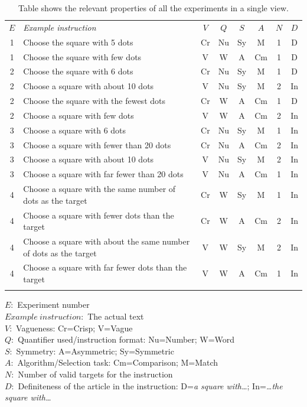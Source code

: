 \documentclass[graybox,envcountchap,sectrefs%
,footinfo
]{svmono}
\begin{document}
\begin{table}
\caption{Table shows the relevant properties of all the experiments in a single view.}
\label{AllInstructions} 
\begin{tabular}{clcccccc}
\hline\noalign{\smallskip}
$E$&\emph{Example instruction}&$V$&$Q$&$S$&$A$&$N$&$D$\\
\noalign{\smallskip}\svhline\noalign{\smallskip}
    1&		Choose the square with 5 dots				&Cr&Nu&Sy&M&1&D\\
    1&		Choose the square with few dots			&V&W&A&Cm&1&D\\
    \hline\noalign{\smallskip}
    2&		Choose the square with 6 dots				&Cr&Nu&Sy&M&1&D\\
    2&		Choose a square with about 10 dots			&V&Nu&Sy&M&2&In\\
    2&		Choose the square with the fewest dots		&Cr&W&A&Cm&1&D\\
    2&		Choose a square with few dots				&V&W&A&Cm&2&In\\
    \hline\noalign{\smallskip}
    3&		Choose a square with 6 dots				&Cr&Nu&Sy&M&1&In\\
    3&		Choose a square with fewer than 20 dots		&Cr&Nu&A&Cm&2&In\\
    3&		Choose a square with about 10 dots			&V&Nu&Sy&M&2&In\\
    3&		Choose a square with far fewer than 20 dots	&V&Nu&A&Cm&1&In\\
    \hline\noalign{\smallskip}
    4&		Choose a square with the same number of dots as the target			&Cr&W&Sy&M&1&In\\
    4&		Choose a square with fewer dots than the target					&Cr&W&A&Cm&2&In\\
    4&		Choose a square with about the same number of dots as the target		&V&W&Sy&M&2&In\\
    4&		Choose a square with far fewer dots than the target					&V&W&A&Cm&1&In\\
\noalign{\smallskip}\hline\noalign{\smallskip}
\end{tabular}

$E$:~Experiment number\\
$Example\ instruction$:~The actual text\\
$V$:~Vagueness: Cr=Crisp; V=Vague\\
$Q$:~Quantifier used/instruction format: Nu=Number; W=Word\\
$S$:~Symmetry: A=Asymmetric; Sy=Symmetric\\
$A$:~Algorithm/Selection task: Cm=Comparison; M=Match\\
$N$:~Number of valid targets for the instruction\\
$D$:~Definiteness of the article in the instruction: D=\emph{a square with\ldots}; In=\emph{\ldots the square with\ldots}\\
\end{table}
\end{document}
